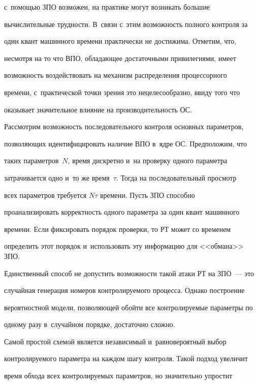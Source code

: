 с~помощью ЗПО возможен, на практике могут возникать большие 


вычислительные трудности. В~связи с~этим возможность полного контроля за 


один квант машинного времени практически не достижима. Отметим, что, 


несмотря на то что ВПО, обладающее достаточными привилегиями, имеет 


воз\-мож\-ность воздействовать на механизм распределения процессорного 


времени, с~практической точки зрения это нецелесообразно, ввиду того что 


оказывает значительное влияние на производительность ОС.


  


  Рассмотрим возможность последовательного контроля основных параметров, 


позволяющих идентифицировать наличие ВПО в~ядре ОС. Предположим, что 


таких параметров~$N$, время дискретно и~на проверку одного параметра 


затрачивается одно и~то же время~$\tau$. Тогда на последовательный просмотр 


всех параметров требуется $N\tau$ времени. Пусть ЗПО способно 


проанализировать корректность одного параметра за один квант машинного 


времени. Если фиксировать порядок проверки, то РТ может со временем 


определить этот порядок и~использовать эту информацию для <<обмана>> ЗПО. 


Единственный способ не допустить воз\-мож\-ности такой атаки РТ на ЗПО~--- это 


случайная генерация номеров контролируемого процесса. Однако построение 


вероятностной модели, позволяющей обойти все контролируемые параметры по 


одному разу в~случайном порядке, достаточно сложно. 


  


  Самой простой схемой является независимый и~равновероятный выбор 


контролируемого параметра на каждом шагу контроля. Такой подход увеличит 


время обхода всех контролируемых параметров, но значительно упростит 


